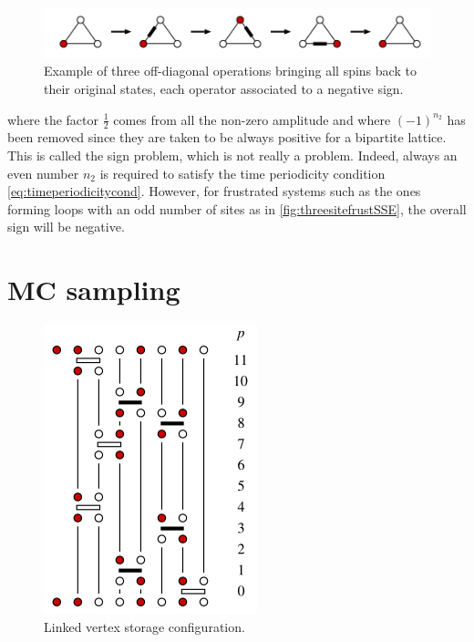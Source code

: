 		\begin{figure}[h!]
            \centering
            \includegraphics[scale=0.7]{graphs/threesitefrustSSE.png}
            \caption{Example of three off-diagonal operations bringing all spins back to their original states, each operator associated to a negative sign.}
            \label{fig:threesitefrustSSE}
        \end{figure}

		where the factor $\frac 1 2$ comes from all the non-zero amplitude and where $(-1)^{n_2}$ has been removed since they are taken to be always positive for a bipartite lattice. This is called the sign problem, which is not really a problem. Indeed, always an even number $n_2$ is required to satisfy the time periodicity condition \eqref{eq:timeperiodicitycond}. However, for frustrated systems such as the ones forming loops with an odd number of sites as in \autoref{fig:threesitefrustSSE}, the overall sign will be negative.

	\section{MC sampling}

		\begin{figure}[h!]
            \centering
            \includegraphics[scale=0.7]{graphs/linkedvertexSSE.png}
            \caption{Linked vertex storage configuration.}
            \label{fig:linkedvertexSSE}
        \end{figure}

